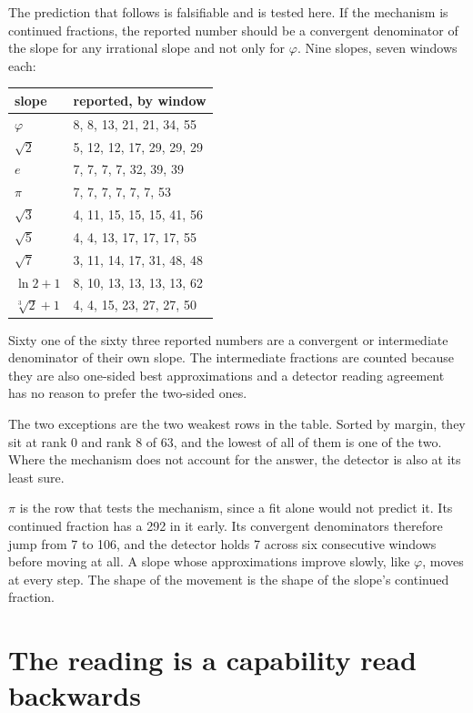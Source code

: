 The prediction that follows is falsifiable and is tested here. If the mechanism is continued fractions,
the reported number should be a convergent denominator of the slope for any irrational slope and not
only for \(\varphi\). Nine slopes, seven windows each:

\begin{center}
\begin{tabular}{@{}ll@{}}
\toprule
slope & reported, by window \\
\midrule
\(\varphi\) & 8, 8, 13, 21, 21, 34, 55 \\
\(\sqrt 2\) & 5, 12, 12, 17, 29, 29, 29 \\
\(e\) & 7, 7, 7, 7, 32, 39, 39 \\
\(\pi\) & 7, 7, 7, 7, 7, 7, 53 \\
\(\sqrt 3\) & 4, 11, 15, 15, 15, 41, 56 \\
\(\sqrt 5\) & 4, 4, 13, 17, 17, 17, 55 \\
\(\sqrt 7\) & 3, 11, 14, 17, 31, 48, 48 \\
\(\ln 2 + 1\) & 8, 10, 13, 13, 13, 13, 62 \\
\(\sqrt[3]{2} + 1\) & 4, 4, 15, 23, 27, 27, 50 \\
\bottomrule
\end{tabular}
\end{center}

Sixty one of the sixty three reported numbers are a convergent or intermediate denominator of their
own slope. The intermediate fractions are counted because they are also one-sided best
approximations and a detector reading agreement has no reason to prefer the two-sided ones.

The two exceptions are the two weakest rows in the table. Sorted by margin, they sit at rank 0 and
rank 8 of 63, and the lowest of all of them is one of the two. Where the mechanism does not
account for the answer, the detector is also at its least sure.

\(\pi\) is the row that tests the mechanism, since a fit alone would not predict it. Its continued
fraction has a 292 in it early. Its convergent denominators therefore jump from 7 to 106, and the
detector holds 7 across six consecutive windows before moving at all. A slope whose approximations improve slowly,
like \(\varphi\), moves at every step. The shape of the movement is the shape of the slope's
continued fraction.

\section{The reading is a capability read backwards}

